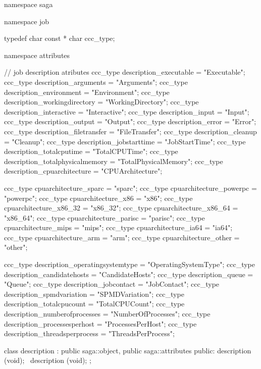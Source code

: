    \begin{mycode}[label=Prototypes: saga::job]
  namespace saga
  {
    namespace job 
    {
      typedef char const * char ccc_type;
  
      namespace attributes 
      {
        // job description atributes
        ccc_type description_executable          = "Executable";
        ccc_type description_arguments           = "Arguments";
        ccc_type description_environment         = "Environment";
        ccc_type description_workingdirectory    = "WorkingDirectory";
        ccc_type description_interactive         = "Interactive";
        ccc_type description_input               = "Input";
        ccc_type description_output              = "Output";
        ccc_type description_error               = "Error";
        ccc_type description_filetransfer        = "FileTransfer";
        ccc_type description_cleanup             = "Cleanup";
        ccc_type description_jobstarttime        = "JobStartTime";
        ccc_type description_totalcputime        = "TotalCPUTime";
        ccc_type description_totalphysicalmemory = "TotalPhysicalMemory";
        ccc_type description_cpuarchitecture     = "CPUArchitecture";
  
        ccc_type cpuarchitecture_sparc           = "sparc";
        ccc_type cpuarchitecture_powerpc         = "powerpc";
        ccc_type cpuarchitecture_x86             = "x86";
        ccc_type cpuarchitecture_x86_32          = "x86_32";
        ccc_type cpuarchitecture_x86_64          = "x86_64";
        ccc_type cpuarchitecture_parisc          = "parisc";
        ccc_type cpuarchitecture_mips            = "mips";
        ccc_type cpuarchitecture_ia64            = "ia64";
        ccc_type cpuarchitecture_arm             = "arm";
        ccc_type cpuarchitecture_other           = "other";
  
        ccc_type description_operatingsystemtype = "OperatingSystemType";
        ccc_type description_candidatehosts      = "CandidateHosts";
        ccc_type description_queue               = "Queue";
        ccc_type description_jobcontact          = "JobContact";
        ccc_type description_spmdvariation       = "SPMDVariation";
        ccc_type description_totalcpucount       = "TotalCPUCount";
        ccc_type description_numberofprocesses   = "NumberOfProcesses";
        ccc_type description_processesperhost    = "ProcessesPerHost";
        ccc_type description_threadsperprocess   = "ThreadsPerProcess";
      }
  
      class description 
          : public saga::object,
            public saga::attributes
      {
        public:
          description (void);
         ~description (void);
      }; 
  
}}
\end{mycode}
